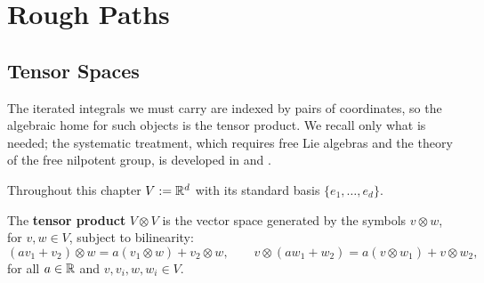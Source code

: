 
\section{Rough Paths}\label{sec:roughpaths}

\subsection{Tensor Spaces}\label{subsec:tensorspaces}

The iterated integrals we must carry are indexed by pairs of coordinates, so the algebraic home
for such objects is the tensor product. We recall only what is needed; the systematic treatment,
which requires free Lie algebras and the theory of the free nilpotent group, is developed in
\cite[Ch.\ 3]{geng2021} and \cite[Ch.\ 7]{frizvictoir2010}.

Throughout this chapter $V := \mathbb{R}^d$ with its standard basis $\{e_1,\dots,e_d\}$.

\begin{definition}\label{def:tensorproduct}
The \textbf{tensor product} $V \otimes V$ is the vector space generated by the symbols
$v \otimes w$, for $v,w \in V$, subject to bilinearity:
\begin{equation}\label{eq:bilinearity}
(av_1 + v_2)\otimes w = a(v_1\otimes w) + v_2 \otimes w, \qquad
v \otimes (aw_1 + w_2) = a(v\otimes w_1) + v\otimes w_2 ,
\end{equation}
for all $a \in \mathbb{R}$ and $v,v_i,w,w_i \in V$.
\end{definition}

